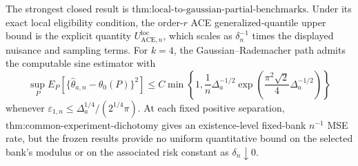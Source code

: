 The strongest closed result is \(\text{thm:local-to-gaussian-partial-benchmarks}\).  Under its exact local eligibility condition, the order-\(r\) ACE generalized-quantile upper bound is the explicit quantity \(U_{\mathrm{ACE},n}^{\mathrm{loc}}\), which scales as \(\delta_n^{-1}\) times the displayed nuisance and sampling terms.  For \(k=4\), the Gaussian--Rademacher path admits the computable sine estimator with
\[
 \sup_P E_P\!\left[
   \{\widehat\theta_{a,n}-\theta_0(P)\}^{2}
 \right]
 \le C\min\!\left\{
  1,\frac{1}{n}\Delta_a^{-1/2}
  \exp\!\left(\frac{\pi^2\sqrt2}{4}\Delta_a^{-1/2}\right)
 \right\}
\]
whenever \(\varepsilon_{1,n}\le\Delta_a^{1/4}/(2^{1/4}\pi)\).  At each fixed positive separation, \(\text{thm:common-experiment-dichotomy}\) gives an existence-level fixed-bank \(n^{-1}\) MSE rate, but the frozen results provide no uniform quantitative bound on the selected bank's modulus or on the associated risk constant as \(\delta_n\downarrow0\).